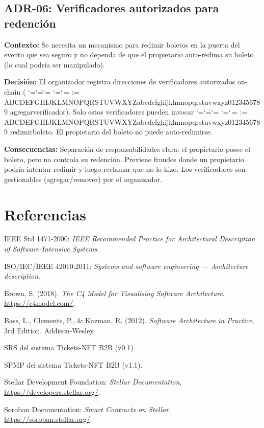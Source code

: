 \documentclass[12pt,oneside]{article}
\makeatletter
\def\ttbreak@uscore{\char95\penalty0\hskip0pt\relax}%
\def\ttbreak@actcat#1{\catcode`#1=\active}%
\def\ttbreak@chars{%
  \catcode`\/=\active \catcode`\.=\active \catcode`\:=\active
  \catcode`\-=\active \catcode`\,=\active
  \@tfor\ttbreak@c:=%
ABCDEFGHIJKLMNOPQRSTUVWXYZabcdefghijklmnopqrstuvwxyz0123456789\do{%
    \expandafter\ttbreak@actcat\ttbreak@c}%
  \let\_\ttbreak@uscore}%
\DeclareRobustCommand{\texttt}{\begingroup\ttfamily\ttbreak@chars\ttbreak@grab}
\def\ttbreak@grab#1{#1\endgroup}
\makeatother
\begin{document}
\subsection{ADR-06: Verificadores autorizados para redención}

\textbf{Contexto:} Se necesita un mecanismo para redimir boletos en la puerta del evento que sea seguro y no dependa de que el propietario auto-redima su boleto (lo cual podría ser manipulado).

\textbf{Decisión:} El organizador registra direcciones de verificadores autorizados on-chain (\texttt{agregar\_verificador}). Solo estos verificadores pueden invocar \texttt{redimir\_boleto}. El propietario del boleto no puede auto-redimirse.

\textbf{Consecuencias:} Separación de responsabilidades clara: el propietario posee el boleto, pero no controla su redención. Previene fraudes donde un propietario podría intentar redimir y luego reclamar que no lo hizo. Los verificadores son gestionables (agregar/remover) por el organizador.


\section*{Referencias}
\label{sec:referencias}

\begin{enumerate}[leftmargin=*,label={[\arabic*]}]
  \item IEEE Std 1471-2000: \textit{IEEE Recommended Practice for Architectural Description of Software-Intensive Systems}.
  \item ISO/IEC/IEEE 42010:2011: \textit{Systems and software engineering — Architecture description}.
  \item Brown, S. (2018). \textit{The C4 Model for Visualising Software Architecture}. \url{https://c4model.com/}.
  \item Bass, L., Clements, P., \& Kazman, R. (2012). \textit{Software Architecture in Practice}, 3rd Edition. Addison-Wesley.
  \item SRS del sistema Tickets-NFT B2B (v0.1).
  \item SPMP del sistema Tickets-NFT B2B (v1.1).
  \item Stellar Development Foundation: \textit{Stellar Documentation}, \url{https://developers.stellar.org/}.
  \item Soroban Documentation: \textit{Smart Contracts on Stellar}, \url{https://soroban.stellar.org/}.
\end{enumerate}
\end{document}
